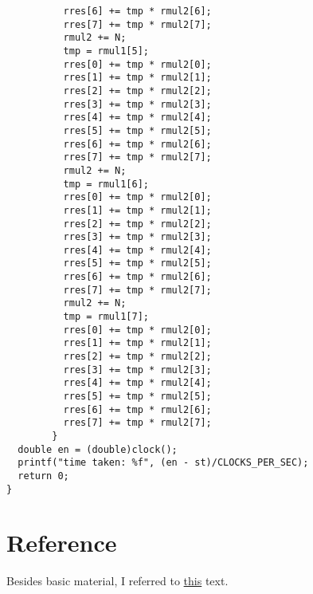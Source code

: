 \documentclass[12pt,3p]{elsarticle}
\begin{document}
\begin{verbatim}
          rres[6] += tmp * rmul2[6];
          rres[7] += tmp * rmul2[7];
          rmul2 += N;
          tmp = rmul1[5];
          rres[0] += tmp * rmul2[0];
          rres[1] += tmp * rmul2[1];
          rres[2] += tmp * rmul2[2];
          rres[3] += tmp * rmul2[3];
          rres[4] += tmp * rmul2[4];
          rres[5] += tmp * rmul2[5];
          rres[6] += tmp * rmul2[6];
          rres[7] += tmp * rmul2[7];
          rmul2 += N;
          tmp = rmul1[6];
          rres[0] += tmp * rmul2[0];
          rres[1] += tmp * rmul2[1];
          rres[2] += tmp * rmul2[2];
          rres[3] += tmp * rmul2[3];
          rres[4] += tmp * rmul2[4];
          rres[5] += tmp * rmul2[5];
          rres[6] += tmp * rmul2[6];
          rres[7] += tmp * rmul2[7];
          rmul2 += N;
          tmp = rmul1[7];
          rres[0] += tmp * rmul2[0];
          rres[1] += tmp * rmul2[1];
          rres[2] += tmp * rmul2[2];
          rres[3] += tmp * rmul2[3];
          rres[4] += tmp * rmul2[4];
          rres[5] += tmp * rmul2[5];
          rres[6] += tmp * rmul2[6];
          rres[7] += tmp * rmul2[7];
        }
  double en = (double)clock();       
  printf("time taken: %f", (en - st)/CLOCKS_PER_SEC);
  return 0;
}
\end{verbatim}

\section{Reference}

Besides basic material, I referred to \href{https://people.freebsd.org/~lstewart/articles/cpumemory.pdf}{this} text. 
\end{document}
